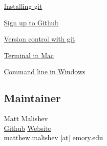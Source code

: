 \documentclass[10,portrait]{article}
\begin{document}
\href{https://git-scm.com/book/en/v2/Getting-Started-Installing-Git}{Installing
git}

\href{https://github.com/}{Sign up to Github}

\href{https://git-scm.com/book/en/v2/Getting-Started-About-Version-Control}{Version
control with git}

\href{https://macpaw.com/how-to/use-terminal-on-mac}{Terminal in Mac}

\href{https://www.computerhope.com/issues/chusedos.htm}{Command line in
Windows}

\subsection{Maintainer}\label{maintainer}

Matt Malishev\\
\href{https://github.com/darwinanddavis}{Github} \textbar{}
\href{https://www.researchgate.net/profile/Matt_Malishev}{Website}\\
matthew.malishev {[}at{]} emory.edu

\printbibliography
\end{document}
